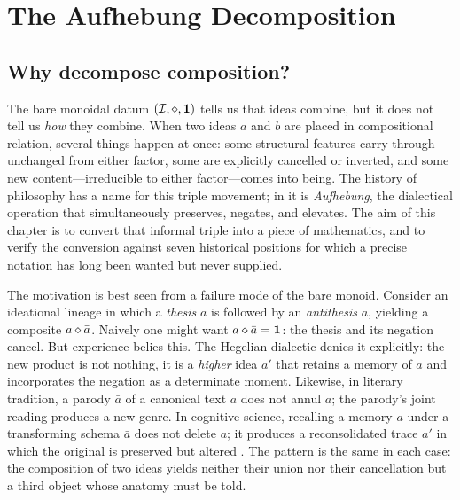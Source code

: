 \chapter{The Aufhebung Decomposition}\label{ch:aufhebung}

\section{Why decompose composition?}\label{sec:why-decompose}

The bare monoidal datum $(\mathcal{I},\mathbin{\diamond},\mathbf{1})$ tells us that ideas
combine, but it does not tell us \emph{how} they combine. When two
ideas $a$ and $b$ are placed in compositional relation, several things
happen at once: some structural features carry through unchanged from
either factor, some are explicitly cancelled or inverted, and some new
content---irreducible to either factor---comes into being. The history
of philosophy has a name for this triple movement; in
\citet{Hegel1812} it is \emph{Aufhebung}, the dialectical operation
that simultaneously preserves, negates, and elevates. The aim of this
chapter is to convert that informal triple into a piece of
mathematics, and to verify the conversion against seven historical
positions for which a precise notation has long been wanted but never
supplied.

The motivation is best seen from a failure mode of the bare monoid.
Consider an ideational lineage in which a \emph{thesis} $a$ is followed
by an \emph{antithesis} $\bar a$, yielding a composite $a\mathbin{\diamond}\bar
a$. Naively one might want $a\mathbin{\diamond}\bar a=\mathbf{1}$: the thesis and its
negation cancel. But experience belies this. The Hegelian dialectic
denies it explicitly: the new product is not nothing, it is a
\emph{higher} idea $a'$ that retains a memory of $a$ and incorporates
the negation as a determinate moment. Likewise, in literary tradition,
a parody $\bar a$ of a canonical text $a$ does not annul $a$; the
parody's joint reading produces a new genre. In cognitive science,
recalling a memory $a$ under a transforming schema $\bar a$ does not
delete $a$; it produces a reconsolidated trace $a'$ in which the
original is preserved but altered \citep{Adorno1966}. The pattern is
the same in each case: the composition of two ideas yields neither
their union nor their cancellation but a third object whose anatomy
must be told.

